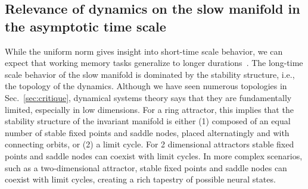 \documentclass{article} %
\newcommand{\mpcomment}[1]{\textcolor{mpcolor}{(#1)}}
\newcommand{\pscomment}[1]{\textcolor{BurntOrange}{(#1)}}
\newcounter{ct}
\theoremstyle{definition}
\theoremstyle{remark}
\begin{document}
\subsection{Relevance of dynamics on the slow manifold in the asymptotic time scale}\label{sec:attractor_bif}
While the uniform norm gives insight into short-time scale behavior, we can expect that working memory tasks generalize to longer durations~\citep{Park2023a}.
The long-time scale behavior of the slow manifold is dominated by the stability structure, i.e., the topology of the dynamics.
Although we have seen numerous topologies in Sec.~\ref{sec:critique}, dynamical systems theory says that they are fundamentally limited, especially in low dimensions.
For a ring attractor, this implies that the stability structure of the invariant manifold is either
(1) composed of an equal number of stable fixed points and saddle nodes, placed alternatingly and with connecting orbits, or (2) a limit cycle.
For 2 dimensional attractors stable fixed points and saddle nodes can coexist with limit cycles.
In more complex scenarios, such as a two-dimensional attractor, stable fixed points and saddle nodes can coexist with limit cycles, creating a rich tapestry of possible neural states.
\end{document}
